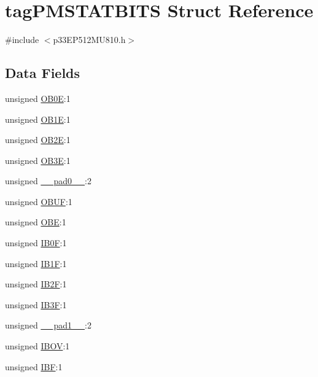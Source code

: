 \hypertarget{structtag_p_m_s_t_a_t_b_i_t_s}{}\section{tag\+P\+M\+S\+T\+A\+T\+B\+I\+TS Struct Reference}
\label{structtag_p_m_s_t_a_t_b_i_t_s}


{\ttfamily \#include $<$p33\+E\+P512\+M\+U810.\+h$>$}

\subsection*{Data Fields}
\begin{DoxyCompactItemize}
\item 
unsigned \hyperlink{structtag_p_m_s_t_a_t_b_i_t_s_acd54ab08f357fc53537ef4240859f7ca}{O\+B0E}\+:1
\item 
unsigned \hyperlink{structtag_p_m_s_t_a_t_b_i_t_s_a3406342c568f39e33a472a86852eb646}{O\+B1E}\+:1
\item 
unsigned \hyperlink{structtag_p_m_s_t_a_t_b_i_t_s_a53924d84cd295bee9d01322b121767fe}{O\+B2E}\+:1
\item 
unsigned \hyperlink{structtag_p_m_s_t_a_t_b_i_t_s_a316019e9784ff9bdda0665a7383753dd}{O\+B3E}\+:1
\item 
unsigned \hyperlink{structtag_p_m_s_t_a_t_b_i_t_s_adf71f3d8410c1f1dbbc96680a92c49af}{\+\_\+\+\_\+pad0\+\_\+\+\_\+}\+:2
\item 
unsigned \hyperlink{structtag_p_m_s_t_a_t_b_i_t_s_a74f6fa1b58aeb6463ddbe165a94b851c}{O\+B\+UF}\+:1
\item 
unsigned \hyperlink{structtag_p_m_s_t_a_t_b_i_t_s_aabbb19292e78e1f44df1eecf66ed08ec}{O\+BE}\+:1
\item 
unsigned \hyperlink{structtag_p_m_s_t_a_t_b_i_t_s_a876f50b77ee5632f91ad63611752c756}{I\+B0F}\+:1
\item 
unsigned \hyperlink{structtag_p_m_s_t_a_t_b_i_t_s_ab31c8bb37f7f7599669c801a1d903c7c}{I\+B1F}\+:1
\item 
unsigned \hyperlink{structtag_p_m_s_t_a_t_b_i_t_s_a58ef253f8e10eb6c6d131b5102a1285d}{I\+B2F}\+:1
\item 
unsigned \hyperlink{structtag_p_m_s_t_a_t_b_i_t_s_ad81e9f5d84b4c44943daebb49c844abd}{I\+B3F}\+:1
\item 
unsigned \hyperlink{structtag_p_m_s_t_a_t_b_i_t_s_acaf2d0924a107ec6e8d2e31febaf66f9}{\+\_\+\+\_\+pad1\+\_\+\+\_\+}\+:2
\item 
unsigned \hyperlink{structtag_p_m_s_t_a_t_b_i_t_s_afa32b0a20f26513a6ab1b4e5351e32c5}{I\+B\+OV}\+:1
\item 
unsigned \hyperlink{structtag_p_m_s_t_a_t_b_i_t_s_abe5c97dbd24e0db1b78172b68f9efaf0}{I\+BF}\+:1
\end{DoxyCompactItemize}


